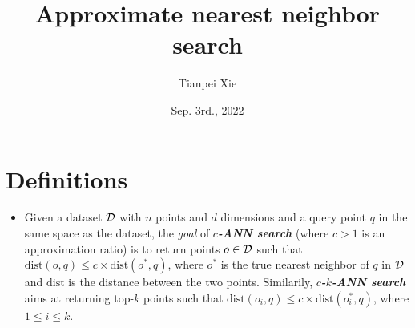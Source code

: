 \documentclass[11pt]{article}
\begin{document}
\title{Approximate nearest neighbor search}
\author{ Tianpei Xie}
\date{Sep. 3rd., 2022 }
\maketitle
\tableofcontents
\newpage
\allowdisplaybreaks
\section{Definitions}
\begin{itemize}
\item Given a dataset ${\mathcal D}$ with $n$ points and $d$ dimensions and a query point $q$ in the same space as the dataset, the \emph{goal} of \emph{\textbf{$c$-ANN search}} (where $c > 1$ is an approximation ratio) is to return points $o \in {\mathcal D}$ such that $\text{dist}(o, q) \le  c \times \text{dist}(o^{*}, q)$, where $o^{*}$ is the true nearest neighbor of $q$ in ${\mathcal D}$ and $\text{dist}$ is the distance between the two points. Similarily, \textbf{\emph{$c$-$k$-ANN search}} aims at returning top-$k$ points such that $\text{dist}(o_i, q) \le  c \times \text{dist}(o_i^{*}, q)$, where $1 \le i \le k$. \citep{jafari2021survey}
\end{itemize}



\newpage


\end{document}
